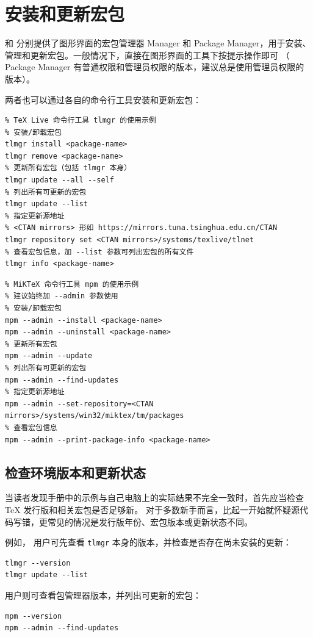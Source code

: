 \section{安装和更新宏包}\label{sec:pkg-manager}

 和  分别提供了图形界面的宏包管理器  Manager 和
 Package Manager，用于安装、管理和更新宏包。一般情况下，直接在图形界面的工具下按提示操作即可
（ Package Manager 有普通权限和管理员权限的版本，建议总是使用管理员权限的版本）。

两者也可以通过各自的命令行工具安装和更新宏包：
\begin{verbatim}
% TeX Live 命令行工具 tlmgr 的使用示例
% 安装/卸载宏包
tlmgr install <package-name>
tlmgr remove <package-name>
% 更新所有宏包（包括 tlmgr 本身）
tlmgr update --all --self
% 列出所有可更新的宏包
tlmgr update --list
% 指定更新源地址
% <CTAN mirrors> 形如 https://mirrors.tuna.tsinghua.edu.cn/CTAN
tlmgr repository set <CTAN mirrors>/systems/texlive/tlnet
% 查看宏包信息，加 --list 参数可列出宏包的所有文件
tlmgr info <package-name>
\end{verbatim}

\begin{verbatim}
% MiKTeX 命令行工具 mpm 的使用示例
% 建议始终加 --admin 参数使用
% 安装/卸载宏包
mpm --admin --install <package-name>
mpm --admin --uninstall <package-name>
% 更新所有宏包
mpm --admin --update
% 列出所有可更新的宏包
mpm --admin --find-updates
% 指定更新源地址
mpm --admin --set-repository=<CTAN mirrors>/systems/win32/miktex/tm/packages
% 查看宏包信息
mpm --admin --print-package-info <package-name>
\end{verbatim}

\subsection{检查环境版本和更新状态}\label{subsec:dist-version-check}

当读者发现手册中的示例与自己电脑上的实际结果不完全一致时，首先应当检查\TeX{} 发行版和相关宏包是否足够新。
对于多数新手而言，比起一开始就怀疑源代码写错，更常见的情况是发行版年份、宏包版本或更新状态不同。

例如， 用户可先查看 \texttt{tlmgr} 本身的版本，并检查是否存在尚未安装的更新：
\begin{verbatim}
tlmgr --version
tlmgr update --list
\end{verbatim}

 用户则可查看包管理器版本，并列出可更新的宏包：
\begin{verbatim}
mpm --version
mpm --admin --find-updates
\end{verbatim}

